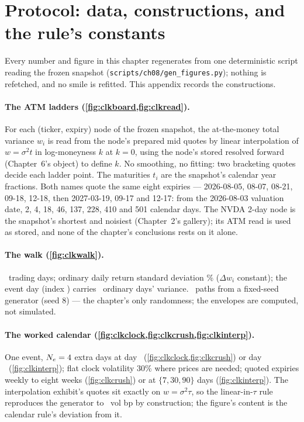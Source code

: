 \section{Protocol: data, constructions, and the rule's constants}
\label{app:clkprotocol}

Every number and figure in this chapter regenerates from one
deterministic script reading the frozen snapshot
(\texttt{scripts/ch08/gen\_figures.py}); nothing is refetched, and no
smile is refitted.  This appendix records the constructions.

\paragraph{The ATM ladders (\cref{fig:clkboard,fig:clkread}).}
For each (ticker, expiry) node of the frozen snapshot, the
at-the-money total variance $w_i$ is read from the node's prepared
mid quotes by linear interpolation of $w=\sigma^2 t$ in log-moneyness
$k$ at $k=0$, using the node's stored resolved forward (Chapter~6's
object) to define $k$.  No smoothing, no fitting: two bracketing
quotes decide each ladder point.  The maturities $t_i$ are the
snapshot's calendar year fractions.  Both names quote the same eight
expiries --- 2026-08-05, 08-07, 08-21, 09-18, 12-18, then 2027-03-19,
09-17 and 12-17: from the 2026-08-03 valuation date, 2, 4, 18, 46,
137, 228, 410 and 501 calendar days.  The NVDA 2-day node is the
snapshot's shortest and noisiest (Chapter~2's gallery); its ATM read
is used as stored, and none of the chapter's conclusions rests on it
alone.

\paragraph{The walk (\cref{fig:clkwalk}).}
\MacClkWalkDays\ trading days; ordinary daily return standard
deviation \MacClkWalkDailyPct\% ($\Delta w_i$ constant); the event
day (index \MacClkWalkEventDay) carries \MacClkWalkEventUnits\ ordinary
days' variance.  \MacClkWalkPaths\ paths from a fixed-seed generator
(seed 8) --- the chapter's only randomness; the envelopes are
computed, not simulated.

\paragraph{The worked calendar
(\cref{fig:clkclock,fig:clkcrush,fig:clkinterp}).}
One event, $N_e=4$ extra days at day
\MacClkClockEventDay\ (\cref{fig:clkclock,fig:clkcrush}) or day
\MacClkInterpOverDay\ (\cref{fig:clkinterp}); flat clock volatility
$30\%$ where prices are needed; quoted expiries weekly to eight weeks
(\cref{fig:clkcrush}) or at $\{7,30,90\}$ days
(\cref{fig:clkinterp}).  The interpolation exhibit's quotes sit
exactly on $w=\sigma^2\tau$, so the linear-in-$\tau$ rule reproduces
the generator to \MacClkInterpExactBp\ vol bp by construction; the
figure's content is the calendar rule's deviation from it.


